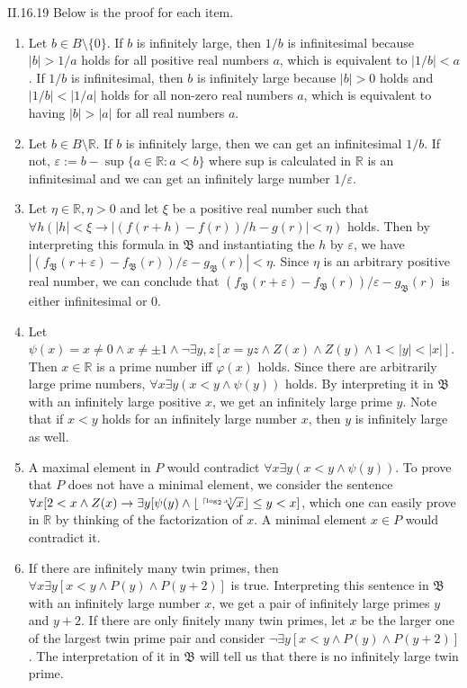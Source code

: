 \documentclass[12pt]{article}
\begin{document}
\begin{customthm}{II.16.19}
  Below is the proof for each item.
  \begin{enumerate}
    \item Let $b\in B\setminus\{0\}$. If $b$ is infinitely large, then $1/b$ is infinitesimal because $|b|>1/a$ holds for all positive real numbers $a$, which is equivalent to $|1/b|<a$. If $1/b$ is infinitesimal, then $b$ is infinitely large because $|b|>0$ holds and $|1/b|<|1/a|$ holds for all non-zero real numbers $a$, which is equivalent to having $|b|>|a|$ for all real numbers $a$.
    \item Let $b\in B\setminus\mathbb{R}$. If $b$ is infinitely large, then we can get an infinitesimal $1/b$. If not, $\varepsilon:=b-\sup\{a\in\mathbb{R}:a<b\}$ where sup is calculated in $\mathbb{R}$ is an infinitesimal and we can get an infinitely large number $1/\varepsilon$.
    \item Let $\eta\in\mathbb{R},\eta>0$ and let $\xi$ be a positive real number such that $\forall h(|h|<\xi\rightarrow|(f(r+h)-f(r))/h-g(r)|<\eta)$ holds. Then by interpreting this formula in $\mathfrak{B}$ and instantiating the $h$ by $\varepsilon$, we have $|(f_\mathfrak{B}(r+\varepsilon)-f_\mathfrak{B}(r))/\varepsilon-g_\mathfrak{B}(r)|<\eta$. Since $\eta$ is an arbitrary positive real number, we can conclude that $(f_\mathfrak{B}(r+\varepsilon)-f_\mathfrak{B}(r))/\varepsilon-g_\mathfrak{B}(r)$ is either infinitesimal or $0$.
    \item Let $\psi(x)=x\neq0\wedge x\neq\pm 1\wedge\neg\exists y,z[x=yz\wedge Z(x)\wedge Z(y)\wedge1<|y|<|x|]$. Then $x\in\mathbb{R}$ is a prime number iff $\varphi(x)$ holds. Since there are arbitrarily large prime numbers, $\forall x\exists y(x<y\wedge\psi(y))$ holds. By interpreting it in $\mathfrak{B}$ with an infinitely large positive $x$, we get an infinitely large prime $y$. Note that if $x<y$ holds for an infinitely large number $x$, then $y$ is infinitely large as well.
    \item A maximal element in $P$ would contradict $\forall x\exists y(x<y\wedge\psi(y))$. To prove that $P$ does not have a minimal element, we consider the sentence $\forall x [2<x\wedge Z(x)\rightarrow\exists y[\psi(y)\wedge\floor*{\sqrt[\ceil*{\log_2x}]{x}}\leq y<x]$, which one can easily prove in $\mathbb{R}$ by thinking of the factorization of $x$. A minimal element $x\in P$ would contradict it.
    \item If there are infinitely many twin primes, then $\forall x\exists y[x<y\wedge P(y)\wedge P(y+2)]$ is true. Interpreting this sentence in $\mathfrak{B}$ with an infinitely large number $x$, we get a pair of infinitely large primes $y$ and $y+2$. If there are only finitely many twin primes, let $x$ be the larger one of the largest twin prime pair and consider $\neg\exists y[x<y\wedge P(y)\wedge P(y+2)]$. The interpretation of it in $\mathfrak{B}$ will tell us that there is no infinitely large twin prime.
  \end{enumerate}
\end{customthm}
\end{document}
